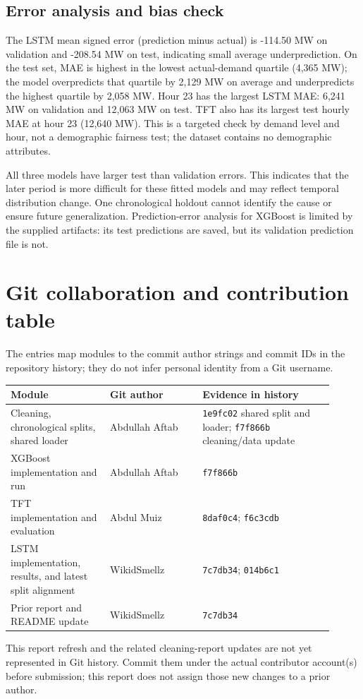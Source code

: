 \documentclass[11pt,a4paper]{article}
\begin{document}
\subsection{Error analysis and bias check}
The LSTM mean signed error (prediction minus actual) is -114.50 MW on validation and -208.54 MW on test, indicating small average underprediction. On the test set, MAE is highest in the lowest actual-demand quartile (4,365 MW); the model overpredicts that quartile by 2,129 MW on average and underpredicts the highest quartile by 2,058 MW. Hour 23 has the largest LSTM MAE: 6,241 MW on validation and 12,063 MW on test. TFT also has its largest test hourly MAE at hour 23 (12,640 MW). This is a targeted check by demand level and hour, not a demographic fairness test; the dataset contains no demographic attributes.

All three models have larger test than validation errors. This indicates that the later period is more difficult for these fitted models and may reflect temporal distribution change. One chronological holdout cannot identify the cause or ensure future generalization. Prediction-error analysis for XGBoost is limited by the supplied artifacts: its test predictions are saved, but its validation prediction file is not.

\section{Git collaboration and contribution table}
The entries map modules to the commit author strings and commit IDs in the repository history; they do not infer personal identity from a Git username.
\begin{longtable}{p{0.28\linewidth}p{0.26\linewidth}p{0.37\linewidth}}\toprule Module & Git author & Evidence in history \\\midrule
Cleaning, chronological splits, shared loader & Abdullah Aftab & \texttt{1e9fc02} shared split and loader; \texttt{f7f866b} cleaning/data update \\
XGBoost implementation and run & Abdullah Aftab & \texttt{f7f866b} \\
TFT implementation and evaluation & Abdul Muiz & \texttt{8daf0c4}; \texttt{f6c3cdb} \\
LSTM implementation, results, and latest split alignment & WikidSmellz & \texttt{7c7db34}; \texttt{014b6c1} \\
Prior report and README update & WikidSmellz & \texttt{7c7db34} \\
\bottomrule\end{longtable}
This report refresh and the related cleaning-report updates are not yet represented in Git history. Commit them under the actual contributor account(s) before submission; this report does not assign those new changes to a prior author.
\end{document}
